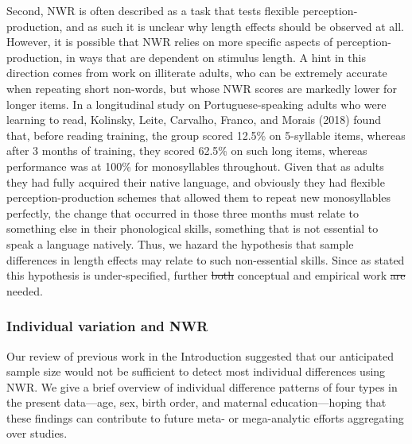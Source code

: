 \documentclass[ %
american, %
,man,floatsintext]{apa6} %
\providecommand{\DIFaddtex}[1]{{\protect\color{blue}\uwave{#1}}} %
\providecommand{\DIFdeltex}[1]{{\protect\color{red}\sout{#1}}}                      %
\providecommand{\DIFaddbegin}{} %
\providecommand{\DIFaddend}{} %
\providecommand{\DIFdelbegin}{} %
\providecommand{\DIFdelend}{} %
\providecommand{\DIFadd}[1]{\texorpdfstring{\DIFaddtex{#1}}{#1}} %
\providecommand{\DIFdel}[1]{\texorpdfstring{\DIFdeltex{#1}}{}} %
\newcommand{\DIFscaledelfig}{0.5}
\newlength{\DIFdelgraphicswidth} %
\newlength{\DIFdelgraphicsheight} %
\newcommand{\DIFaddincludegraphics}[2][]{{\color{blue}\fbox{\DIFOincludegraphics[#1]{#2}}}} %
\newcommand{\DIFdelincludegraphics}[2][]{%
	\sbox{\DIFdelgraphicsbox}{\DIFOincludegraphics[#1]{#2}}%
	\settoboxwidth{\DIFdelgraphicswidth}{\DIFdelgraphicsbox} %
	\settoboxtotalheight{\DIFdelgraphicsheight}{\DIFdelgraphicsbox} %
	\scalebox{\DIFscaledelfig}{%
		\parbox[b]{\DIFdelgraphicswidth}{\usebox{\DIFdelgraphicsbox}\\[-\baselineskip] \rule{\DIFdelgraphicswidth}{0em}}\llap{\resizebox{\DIFdelgraphicswidth}{\DIFdelgraphicsheight}{%
				\setlength{\unitlength}{\DIFdelgraphicswidth}%
				\begin{picture}(1,1)%
				\thicklines\linethickness{2pt} %
				{\color[rgb]{1,0,0}\put(0,0){\framebox(1,1){}}}%
				{\color[rgb]{1,0,0}\put(0,0){\line( 1,1){1}}}%
				{\color[rgb]{1,0,0}\put(0,1){\line(1,-1){1}}}%
				\end{picture}%
			}\hspace*{3pt}}} %
} %
\DeclareRobustCommand{\DIFaddbegin}{\DIFOaddbegin \let\includegraphics\DIFaddincludegraphics} %
\DeclareRobustCommand{\DIFaddend}{\DIFOaddend \let\includegraphics\DIFOincludegraphics} %
\DeclareRobustCommand{\DIFdelbegin}{\DIFOdelbegin \let\includegraphics\DIFdelincludegraphics} %
\DeclareRobustCommand{\DIFdelend}{\DIFOaddend \let\includegraphics\DIFOincludegraphics} %
\begin{document}
Second, NWR is often described as a task that tests flexible perception-production, and as such it is unclear why length effects should be observed at all. However, it is possible that NWR relies on more specific aspects of perception-production, in ways that are dependent on stimulus length. A hint in this direction comes from work on illiterate adults, who can be extremely accurate when repeating short non-words, but whose NWR scores are markedly lower for longer items. In a longitudinal study on Portuguese-speaking adults who were learning to read, Kolinsky, Leite, Carvalho, Franco, and Morais (2018) found that, before reading training, the group scored 12.5\% on 5-syllable items, whereas after 3 months of training, they scored 62.5\% on such long items, whereas performance was at 100\% for monosyllables throughout. Given that as adults they had fully acquired their native language, and obviously they had flexible perception-production schemes that allowed them to repeat new monosyllables perfectly, the change that occurred in those three months must relate to something else in their phonological skills, something that is not essential to speak a language natively. Thus, we hazard the hypothesis that sample differences in length effects may relate to such non-essential skills. Since as stated this hypothesis is under-specified, further \DIFdelbegin \DIFdel{both }\DIFdelend conceptual and empirical work \DIFdelbegin \DIFdel{are }\DIFdelend \DIFaddbegin \DIFadd{is }\DIFaddend needed.

\DIFdelbegin %
\DIFdelend \DIFaddbegin \hypertarget{individual-variation-and-nwr-1}{%
	\subsubsection{Individual variation and NWR}\label{individual-variation-and-nwr-1}}
\DIFaddend 

Our review of previous work in the Introduction suggested that our anticipated sample size would not be sufficient to detect most individual differences using NWR. We give a brief overview of individual difference patterns of four types in the present data---age, sex, birth order, and maternal education---hoping that these findings can contribute to future meta- or mega-analytic efforts aggregating over studies.
\end{document}
